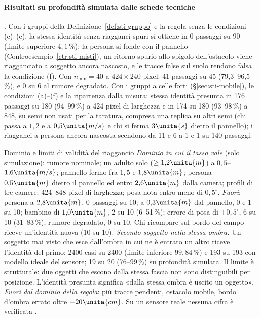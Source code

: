 \paragraph{Risultati su profondità simulata dalle schede tecniche} . Con i gruppi della Definizione~\ref{def:sti-gruppo} e la regola senza le condizioni (c)--(e), la stessa identità senza riagganci spuri si ottiene in 0 passaggi su 90 (limite superiore $4{,}1\,\%$): la persona si fonde con il pannello (Controesempio~\ref{ctr:sti-misti}), un ritorno spurio allo spigolo dell'ostacolo viene riagganciato a soggetto ancora nascosto, e le tracce false sul suolo rendono falsa la condizione (f). Con $n_{\min}=40$ a $424\times240$ pixel: 41 passaggi su 45 (79,3--96,5\,\%), e 0 su 6 al rumore degradato. Con i gruppi a celle forti (\S\ref{sec:sti-mobile}), le condizioni (a)--(f) e la ripartenza dalla misura: stessa identità presunta in 176 passaggi su 180 (94--99\,\%) a 424 pixel di larghezza e in 174 su 180 (93--98\,\%) a 848, su semi non usati per la taratura, compresa una replica su altri semi (chi passa a $1{,}2$ e a $0{,}5\unita{m/s}$ e chi si ferma $3\unita{s}$ dietro il pannello); i riagganci a persona ancora nascosta scendono da 11 e 6 a 1 e 1 su 140 passaggi.

\begin{riquadro}{Dominio e limiti di validità del riaggancio}
\emph{Dominio in cui il tasso vale} (solo simulazione): rumore nominale; un adulto solo ($\ge1{,}2\unita{m}$) a $0{,}5$--$1{,}6\unita{m/s}$; pannello fermo fra $1{,}5$ e $1{,}8\unita{m}$; persona $0{,}5\unita{m}$ dietro il pannello ed entro $2{,}6\unita{m}$ dalla camera; profili di tre camere; 424--848 pixel di larghezza; posa nota entro meno di $0{,}5^\circ$.
\emph{Fuori}: persona a $2{,}8\unita{m}$, 0 passaggi su 10; a $0{,}3\unita{m}$ dal pannello, 0 e 1 su 10; bambino di $1{,}0\unita{m}$, 2 su 10 (6--51\,\%); errore di posa di $+0{,}5^\circ$, 6 su 10 (31--83\,\%); rumore degradato, 0 su 10. Chi ricompare sul bordo del campo riceve un'identità nuova (10 su 10).
\emph{Secondo soggetto nella stessa ombra.} Un soggetto mai visto che esce dall'ombra in cui ne è entrato un altro riceve l'identità del primo: 2400 casi su 2400 (limite inferiore $99{,}84\,\%$) e 193 su 193 con modello ideale del sensore; 19 su 20 (76--99\,\%) su profondità simulata. Il limite è strutturale: due oggetti che escono dalla stessa fascia non sono distinguibili per posizione. L'identità presunta significa «dalla stessa ombra è uscito un oggetto».
\emph{Fuori dal dominio della regola}: più tracce pendenti, ostacolo mobile, bordo d'ombra errato oltre $-20\unita{cm}$. Su un sensore reale nessuna cifra è verificata .
\end{riquadro}
